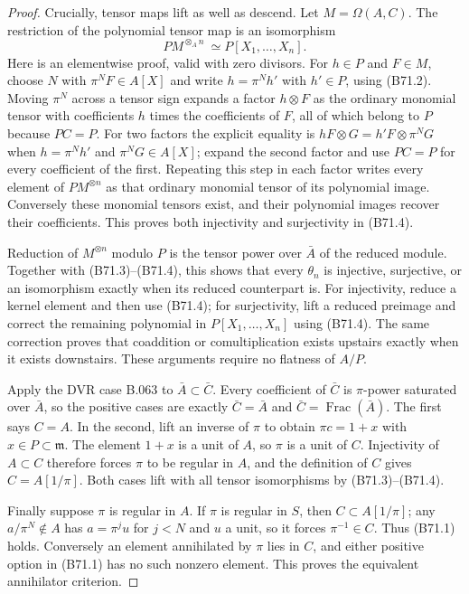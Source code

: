 \begin{proof}
Crucially, tensor maps lift as well as descend. Let $M=\Omega(A,C)$.
The restriction of the polynomial tensor map is an isomorphism
\[
              P M^{\otimes_A n}\ \simeq P[X_1,\ldots,X_n]. \tag{B71.4}
\]
Here is an elementwise proof, valid with zero divisors. For $h\in P$
and $F\in M$, choose $N$ with $\pi^NF\in A[X]$ and write
$h=\pi^Nh'$ with $h'\in P$, using (B71.2). Moving $\pi^N$ across a tensor
sign expands a factor $h\otimes F$ as the ordinary monomial tensor with
coefficients $h$ times the coefficients of $F$, all of which belong to
$P$ because $PC=P$. For two factors the explicit equality is
$hF\otimes G=h'F\otimes\pi^NG$ when $h=\pi^Nh'$ and
$\pi^NG\in A[X]$; expand the second factor and use $PC=P$
for every coefficient of the first.
Repeating this step in each factor writes every
element of $PM^{\otimes n}$ as that ordinary monomial tensor of its
polynomial image. Conversely these monomial tensors exist, and their
polynomial images recover their coefficients. This proves both
injectivity and surjectivity in (B71.4).

Reduction of $M^{\otimes n}$ modulo $P$ is the tensor power over
$\bar A$ of the reduced module. Together with (B71.3)--(B71.4), this
shows that every $\theta_n$ is injective, surjective, or an isomorphism
exactly when its reduced counterpart is. For injectivity, reduce a
kernel element and then use (B71.4); for surjectivity, lift a reduced
preimage and correct the remaining polynomial in $P[X_1,\ldots,X_n]$
using (B71.4). The same correction proves that coaddition or
comultiplication exists upstairs exactly when it exists downstairs.
These arguments require no flatness of $A/P$.

Apply the DVR case B.063 to $\bar A\subset\bar C$. Every coefficient
of $\bar C$ is $\pi$-power saturated over $\bar A$, so the positive cases
are exactly $\bar C=\bar A$ and $\bar C=\operatorname{Frac}(\bar A)$.
The first says $C=A$. In the second, lift an inverse of $\pi$ to obtain
$\pi c=1+x$ with $x\in P\subset\mathfrak m$. The element $1+x$ is a unit
of $A$, so $\pi$ is a unit of $C$. Injectivity of $A\subset C$ therefore
forces $\pi$ to be regular in $A$, and the definition of $C$ gives
$C=A[1/\pi]$. Both cases lift with all tensor isomorphisms by
(B71.3)--(B71.4).

Finally suppose $\pi$ is regular in $A$. If $\pi$ is regular in $S$,
then $C\subset A[1/\pi]$; any $a/\pi^N\notin A$ has
$a=\pi^ju$ for $j<N$ and $u$ a unit, so it forces $\pi^{-1}\in C$.
Thus (B71.1) holds. Conversely an element annihilated by $\pi$ lies in
$C$, and either positive option in (B71.1) has no such nonzero element.
This proves the equivalent annihilator criterion.
\end{proof}
